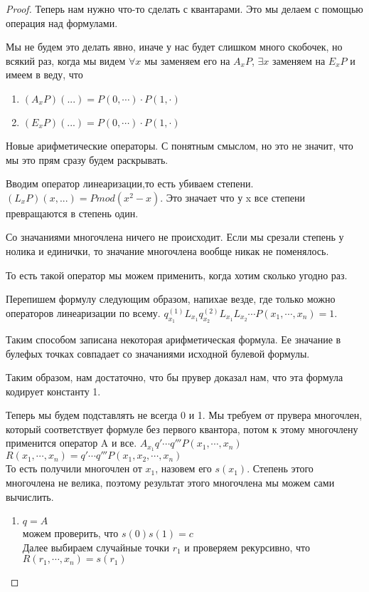 \begin{proof}
Теперь нам нужно что-то
сделать с квантарами. Это мы делаем с помощью операция над формулами.

Мы не будем это делать явно, иначе у нас будет слишком много скобочек, 
но всякий раз, когда мы видем $\forall x$ мы заменяем его 
на $A_xP$, $\exists x$ заменяем на $E_xP$ и имеем в веду, что
\begin{enumerate}
\item 
$(A_xP)(...) = P(0, \cdots)\cdot P(1, \cdot)$\\
\item 
$(E_xP)(...) = P(0, \cdots) \cdot P(1, \cdot)$\\
\end{enumerate}
Новые арифметические операторы. С понятным смыслом, но это
не значит, что мы это прям сразу будем раскрывать.
 
Вводим оператор линеаризации,то есть убиваем степени.   
$(L_xP)(x, ...) = P mod (x^2 - x)$. Это значает что у 
x все степени превращаются в степень один.

Со значаниями многочлена ничего не происходит. Если
мы срезали степень у нолика и единички, то значание
многочлена вообще никак не поменялось.

То есть такой оператор мы можем применить, когда хотим сколько угодно раз. 

Перепишем формулу следующим образом, напихае везде, где только 
можно операторов линеаризации по всему. 
$q_{x_1}^{(1)}L_{x_1}q_{x_2}^{(2)}L_{x_1}L_{x_2} \cdots P(x_1,\cdots, x_n) = 1$.

Таким способом записана некоторая арифметическая формула. Ее
значание в булефых точках совпадает со значаниями исходной булевой
формулы. 

Таким образом, нам достаточно, что бы прувер доказал нам, 
что эта формула кодирует константу 1.

Теперь мы будем подставлять не всегда 0 и 1. Мы
требуем от прувера многочлен, который
соответствует формуле без первого квантора, потом
к этому многочлену применится оператор A и все.
$A_{x_1}q'\cdots q'''P(x_1, \cdots, x_n)$\\
$R(x_1, \cdots, x_n) = q'\cdots q'''P(x_1, x_2, \cdots, x_n)$ \\ 
То есть получили многочлен от $x_1$, назовем его $s(x_1)$. 
Степень этого многочлена не 
велика, поэтому результат этого многочлена мы можем сами вычислить. 
\begin{enumerate}
\item $q = A$\\ 
        можем проверить, что $s(0)s(1) = c$ \\
        Далее выбираем случайные точки $r_1$ и проверяем рекурсивно, 
        что $R(r_1, \cdots, x_n) = s(r_1)$\\


\end{enumerate}
\end{proof}
